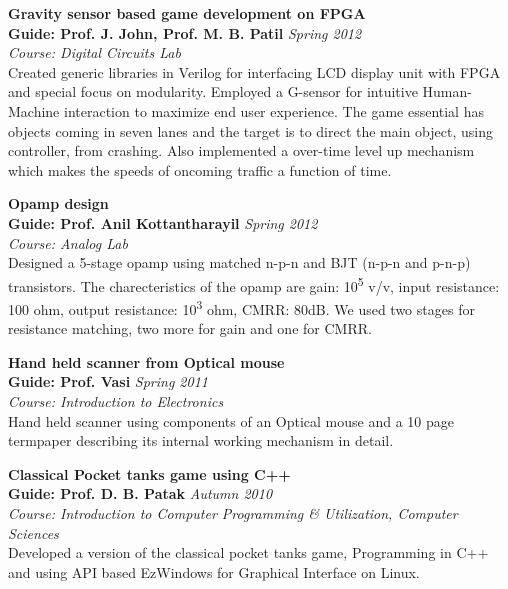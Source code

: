 \documentclass[margin,line]{resume}
\begin{document}
\begin{resume}
	{\bf Gravity sensor based game development on FPGA} \\
    {\bf Guide: Prof. J. John, Prof. M. B. Patil} 	\hfill \textit{Spring 2012} \\
    { \it Course: Digital Circuits Lab}\\
    Created generic libraries in Verilog for interfacing LCD display unit with FPGA and special focus on modularity. Employed a G-sensor for intuitive Human-Machine interaction to maximize end user experience. The game essential has objects coming in seven lanes and the target is to direct the main object, using controller, from crashing. Also implemented a over-time level up mechanism which makes the speeds of oncoming traffic a function of time.

	{\bf Opamp design} \\
    {\bf Guide: Prof. Anil Kottantharayil} 	\hfill \textit{Spring 2012} \\
    { \it Course: Analog Lab}\\
    Designed a 5-stage opamp using matched n-p-n and BJT (n-p-n and p-n-p) transistors. The charecteristics of the opamp are gain: 10\textsuperscript{5} v/v, input resistance: 100 ohm, output resistance: 10\textsuperscript{3} ohm, CMRR: 80dB. We used two stages for resistance matching, two more for gain and one for CMRR.
    
	{\bf Hand held scanner from Optical mouse} \\
    {\bf Guide: Prof. Vasi} 	\hfill \textit{Spring 2011} \\
    { \it Course: Introduction to Electronics}\\
    Hand held scanner using components of an Optical mouse and a 10 page termpaper describing its internal working mechanism in detail.
	
	{\bf Classical Pocket tanks game using C++} \\
    {\bf Guide: Prof. D. B. Patak} 	\hfill \textit{Autumn 2010} \\
    { \it Course: Introduction to Computer Programming \& Utilization, Computer Sciences}\\
	Developed a version of the classical pocket tanks game, Programming in C++ and using API based EzWindows for Graphical Interface on Linux.

\vspace{3mm}


\end{resume}
\end{document}
